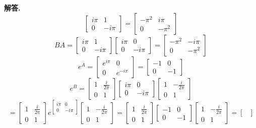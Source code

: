 \documentclass[12pt, a4paper, oneside]{article}
\newenvironment{solution}{\par\noindent\textbf{解答. }}{\par}
\begin{document}
\begin{CJK}{UTF8}{gbsn}
\begin{solution}
$$\begin{bmatrix}
    i\pi & 1 \\ 0 & -i\pi
  \end{bmatrix} =  \begin{bmatrix}
    -\pi^2 & i\pi \\ 0 & -\pi^2
  \end{bmatrix} $$
  $$ BA =  \begin{bmatrix}
    i\pi & 1 \\ 0 & -i\pi
  \end{bmatrix} \begin{bmatrix}
    i\pi & 0 \\ 0 & -i\pi 
  \end{bmatrix}  =  \begin{bmatrix}
    -\pi^2 & -i\pi \\ 0 & -\pi^2
  \end{bmatrix}$$
  $$ e^A = \begin{bmatrix}
    e^{i\pi} & 0 \\ 0 & e^{-i\pi} 
  \end{bmatrix} = \begin{bmatrix}
    -1 & 0 \\ 0 & -1
  \end{bmatrix}$$ 
  $$ e^B = \begin{bmatrix}1&\frac{i}{2\pi }\\ 0&1\end{bmatrix}{\begin{bmatrix}i\pi &0\\ 0&-i\pi \end{bmatrix}}\begin{bmatrix}1&-\frac{i}{2\pi }\\ 0&1\end{bmatrix}$$
  $$ = \begin{bmatrix}1&\frac{i}{2\pi }\\ 0&1\end{bmatrix}e^{\begin{bmatrix}i\pi &0\\ 0&-i\pi \end{bmatrix}}\begin{bmatrix}1&-\frac{i}{2\pi }\\ 0&1\end{bmatrix} = \begin{bmatrix}1&\frac{i}{2\pi }\\ 0&1\end{bmatrix}\begin{bmatrix}-1&0\\ 0&-1\end{bmatrix}\begin{bmatrix}1&-\frac{i}{2\pi }\\ 0&1\end{bmatrix} = \begin{bmatrix}

\end{bmatrix}$$
\end{solution}
\end{CJK}
\end{document}

